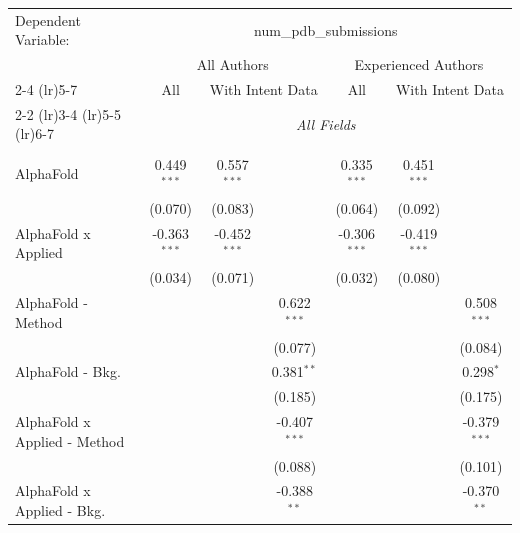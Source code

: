\begingroup
\centering
\begin{tabular}{lcccccc}
   \tabularnewline \midrule \midrule
   Dependent Variable: & \multicolumn{6}{c}{num\_pdb\_submissions}\\
 & \multicolumn{3}{c}{All Authors} & \multicolumn{3}{c}{Experienced Authors} \\
\cmidrule(lr){2-4} \cmidrule(lr){5-7}
 & \multicolumn{1}{c}{All} & \multicolumn{2}{c}{With Intent Data} & \multicolumn{1}{c}{All} & \multicolumn{2}{c}{With Intent Data} \\
\cmidrule(lr){2-2} \cmidrule(lr){3-4} \cmidrule(lr){5-5} \cmidrule(lr){6-7}
 & \multicolumn{6}{c}{\textit{All Fields}} \\ \\
   AlphaFold                      & 0.449$^{***}$  & 0.557$^{***}$  &                & 0.335$^{***}$  & 0.451$^{***}$  &   \\   
                                  & (0.070)        & (0.083)        &                & (0.064)        & (0.092)        &   \\   
   AlphaFold x Applied            & -0.363$^{***}$ & -0.452$^{***}$ &                & -0.306$^{***}$ & -0.419$^{***}$ &   \\   
                                  & (0.034)        & (0.071)        &                & (0.032)        & (0.080)        &   \\   
   AlphaFold - Method             &                &                & 0.622$^{***}$  &                &                & 0.508$^{***}$\\   
                                  &                &                & (0.077)        &                &                & (0.084)\\   
   AlphaFold - Bkg.               &                &                & 0.381$^{**}$   &                &                & 0.298$^{*}$\\   
                                  &                &                & (0.185)        &                &                & (0.175)\\   
   AlphaFold x Applied - Method   &                &                & -0.407$^{***}$ &                &                & -0.379$^{***}$\\   
                                  &                &                & (0.088)        &                &                & (0.101)\\   
   AlphaFold x Applied - Bkg.     &                &                & -0.388$^{**}$  &                &                & -0.370$^{**}$\\   

\end{tabular}
